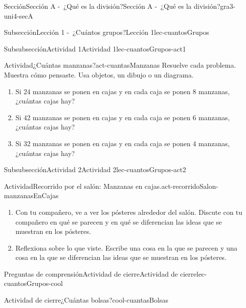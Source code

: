 \documentclass[twoside,10pt,]{article}
\begin{document}
\begin{sectionptx}{Sección}{Sección A -~¿Qué es la división?}{}{Sección A -~¿Qué es la división?}{}{}{gra3-uni4-secA}
\begin{subsectionptx}{Subsección}{Lección 1 -~¿Cuántos grupos?}{}{Lección 1}{}{}{lec-cuantosGrupos}
\typeout{************************************************}
%
\begin{subsubsectionptx}{Subsubsección}{Actividad 1}{}{Actividad 1}{}{}{lec-cuantosGrupos-act1}
\begin{activity}{Actividad}{¿Cuántas manzanas?}{act-cuantasManzanas}%
Resuelve cada problema. Muestra cómo pensaste. Usa objetos, un dibujo o un diagrama.%
\par
%
\begin{enumerate}
\item{}Si 24 manzanas se ponen en cajas y en cada caja se ponen 8 manzanas, ¿cuántas cajas hay?%
\item{}Si 42 manzanas se ponen en cajas y en cada caja se ponen 6 manzanas, ¿cuántas cajas hay?%
\item{}Si 32 manzanas se ponen en cajas y en cada caja se ponen 4 manzanas, ¿cuántas cajas hay?%
\end{enumerate}
%
\end{activity}%
\end{subsubsectionptx}
%
%
\typeout{************************************************}
\typeout{************************************************}
%
\begin{subsubsectionptx}{Subsubsección}{Actividad 2}{}{Actividad 2}{}{}{lec-cuantosGrupos-act2}
\begin{activity}{Actividad}{Recorrido por el salón: Manzanas en cajas.}{act-recorridoSalon-manzanasEnCajas}%
%
\begin{enumerate}
\item{}Con tu compañero, ve a ver los pósteres alrededor del salón. Discute con tu compañero en qué se parecen y en qué se diferencian las ideas que se muestran en los pósteres.%
\item{}Reflexiona sobre lo que viste. Escribe una cosa en la que se parecen y una cosa en la que se diferencian las ideas que se muestran en los pósteres.%
\end{enumerate}
%
\end{activity}%
\end{subsubsectionptx}
%
%
\typeout{************************************************}
\typeout{************************************************}
%
\begin{reading-questions-subsubsection}{Preguntas de comprensión}{Actividad de cierre}{}{Actividad de cierre}{}{}{lec-cuantosGrupos-cool}
\begin{project}{Actividad de cierre}{¿Cuántas bolsas?}{cool-cuantasBolsas}%

\end{project}
\end{reading-questions-subsubsection}
\end{subsectionptx}
\end{sectionptx}
\end{document}
